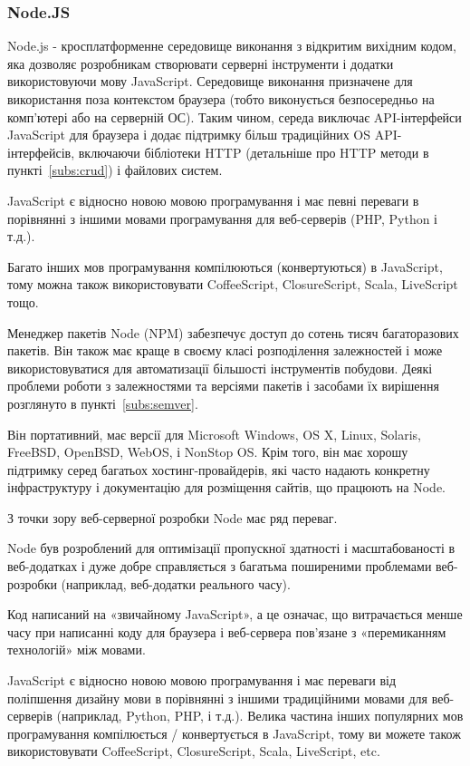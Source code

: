\subsubsection{Node.JS}

Node.js - кросплатформенне середовище виконання з відкритим вихідним кодом, яка дозволяє розробникам створювати серверні інструменти і додатки використовуючи мову JavaScript. Середовище виконання призначене для використання поза контекстом браузера (тобто виконується безпосередньо на комп'ютері або на серверній ОС). Таким чином, середа виключає API-інтерфейси JavaScript для браузера і додає підтримку більш традиційних OS API-інтерфейсів, включаючи бібліотеки HTTP (детальніше про HTTP методи в пункті~\ref{subs:crud}) і файлових систем.

JavaScript є відносно новою мовою програмування і має певні переваги в порівнянні з іншими мовами програмування для веб-серверів (PHP, Python і т.д.).

Багато інших мов програмування компілюються (конвертуються) в JavaScript, тому можна також використовувати CoffeeScript, ClosureScript, Scala, LiveScript тощо.

Менеджер пакетів Node (NPM) забезпечує доступ до сотень тисяч багаторазових пакетів. Він також має краще в своєму класі розподілення залежностей і може використовуватися для автоматизації більшості інструментів побудови. Деякі проблеми роботи з залежностями та версіями пакетів і засобами їх вирішення розглянуто в пункті~\ref{subs:semver}. 

Він портативний, має версії для Microsoft Windows, OS X, Linux, Solaris, FreeBSD, OpenBSD, WebOS, і NonStop OS. Крім того, він має хорошу підтримку серед багатьох хостинг-провайдерів, які часто надають конкретну інфраструктуру і документацію для розміщення сайтів, що працюють на Node.

З точки зору веб-серверної розробки Node має ряд переваг.

Node був розроблений для оптимізації пропускної здатності і масштабованості в веб-додатках і дуже добре справляється з багатьма поширеними проблемами веб-розробки (наприклад, веб-додатки реального часу).

Код написаний на «звичайному JavaScript», а це означає, що витрачається менше часу при написанні коду для браузера і веб-сервера пов'язане з «перемиканням технологій» між мовами.

JavaScript є відносно новою мовою програмування і має переваги від поліпшення дизайну мови в порівнянні з іншими традиційними мовами для веб-серверів (наприклад, Python, PHP, і т.д.). Велика частина інших популярних мов програмування компілюється / конвертується в JavaScript, тому ви можете також використовувати CoffeeScript, ClosureScript, Scala, LiveScript, etc.

